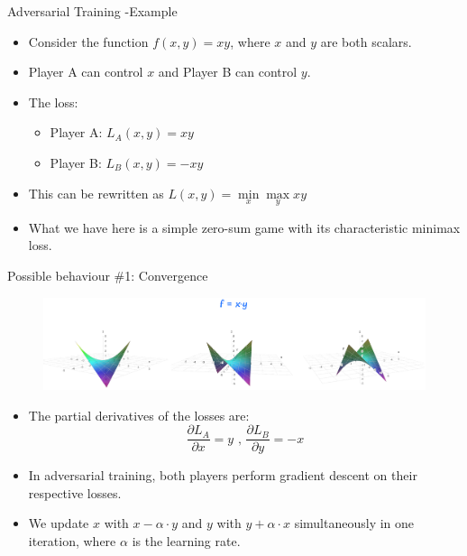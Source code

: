 \begin{frame} {Adversarial Training -Example}
\begin{figure}
\centering
{}
\end{figure}
\begin{itemize}
\item Consider the function $f(x,y) = xy$, where $x$ and $y$ are both scalars.
\item Player A can control $x$ and Player B can control $y$.
    \item The loss:
    \begin{itemize}
\item Player A: $L_{A}(x,y) = xy$
    \item Player B: $L_{B}(x,y) = -xy$
    \end{itemize}
\item This can be rewritten as $L(x,y) = \min \limits_x \max \limits_y xy$
    \item What we have here is a simple zero-sum game with its characteristic minimax loss.
\end{itemize}
\end{frame}

    
\begin{frame} {Possible behaviour \#1: Convergence}
  \begin{figure}
    \centering
     {\includegraphics{plots/adv_xy.png}}
  \end{figure}
  \begin{itemize}
    \item The partial derivatives of the losses are:
     \begin{equation*}
       \frac {\partial{L_{A}}}{\partial x} = y \text{ , }
       \frac {\partial{L_{B}}}{\partial y} = -x
     \end{equation*}
    \item In adversarial training, both players perform gradient descent on their respective losses.
    \item %
    We update $x$ with $x - \alpha \cdot y$ and $y$ with $y + \alpha \cdot x$ simultaneously in one iteration, where $\alpha$ is the learning rate.
  \end{itemize}
\end{frame}

